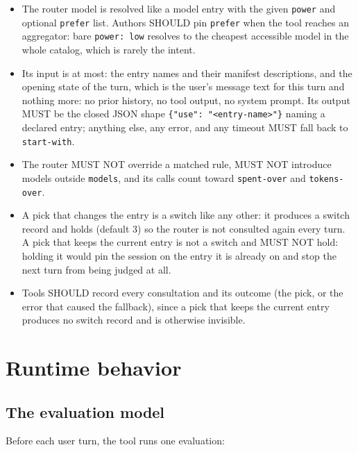 \documentclass[11pt]{article}
\newcommand{\key}[1]{\texttt{#1}}
\begin{document}
\begin{itemize}
  \item The router model is resolved like a model entry with the given
        \key{power} and optional \key{prefer} list. Authors SHOULD pin
        \key{prefer} when the tool reaches an aggregator: bare
        \key{power: low} resolves to the cheapest accessible model in the
        whole catalog, which is rarely the intent.
  \item Its input is at most: the entry names and their manifest
        descriptions, and the opening state of the turn, which is the
        user's message text for this turn and nothing more: no prior
        history, no tool output, no system prompt. Its output MUST be the
        closed JSON shape \key{\{"use": "<entry-name>"\}} naming a declared
        entry; anything else, any error, and any timeout MUST fall back to
        \key{start-with}.
  \item The router MUST NOT override a matched rule, MUST NOT introduce
        models outside \key{models}, and its calls count toward
        \key{spent-over} and \key{tokens-over}.
  \item A pick that changes the entry is a switch like any other: it
        produces a switch record and holds (default 3) so the router is not
        consulted again every turn. A pick that keeps the current entry is
        not a switch and MUST NOT hold: holding it would pin the session on
        the entry it is already on and stop the next turn from being judged
        at all.
  \item Tools SHOULD record every consultation and its outcome (the pick,
        or the error that caused the fallback), since a pick that keeps the
        current entry produces no switch record and is otherwise invisible.
\end{itemize}

\section{Runtime behavior}

\subsection{The evaluation model}
\label{sec:evaluation}

Before each user turn, the tool runs one evaluation:
\end{document}
